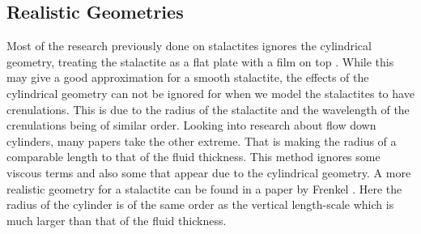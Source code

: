 \documentclass[12pt]{article}
\begin{document}
\subsection{Realistic Geometries}
Most of the research previously done on stalactites ignores the cylindrical geometry, treating the stalactite as a flat plate with a film on top \cite{short,camporeale_2017,doi:10.1098/rspa.2015.0031}. While this may give a good approximation for a smooth stalactite, the effects of the cylindrical geometry can not be ignored for when we model the stalactites to have crenulations. This is due to the radius of the stalactite and the wavelength of the crenulations being of similar order. Looking into research about flow down cylinders, many papers take the other extreme. That is making the radius of a comparable length to that of the fluid thickness\cite{ CRASTER_2006}. This method ignores some viscous terms and also some that appear due to the cylindrical geometry. A more realistic geometry for a stalactite can be found in a paper by Frenkel \cite{Frenkel_1992}. Here the radius of the cylinder is of the same order as the vertical length-scale which is much larger than that of the fluid thickness.
\end{document}
